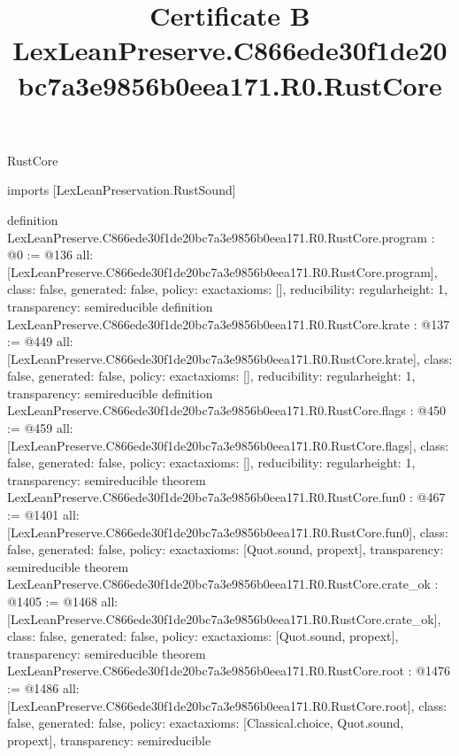 \begin{lexlean}{RustCore}
\title{Certificate B LexLeanPreserve.C866ede30f1de20bc7a3e9856b0eea171.R0.RustCore}
\begin{coremodule}
imports [LexLeanPreservation.RustSound]

definition LexLeanPreserve.C866ede30f1de20bc7a3e9856b0eea171.R0.RustCore.program : @0 := @136 {
  all: [LexLeanPreserve.C866ede30f1de20bc7a3e9856b0eea171.R0.RustCore.program],
  class: false,
  generated: false,
  policy: exact{axioms: []},
  reducibility: regular{height: 1},
  transparency: semireducible
}
definition LexLeanPreserve.C866ede30f1de20bc7a3e9856b0eea171.R0.RustCore.krate : @137 := @449 {
  all: [LexLeanPreserve.C866ede30f1de20bc7a3e9856b0eea171.R0.RustCore.krate],
  class: false,
  generated: false,
  policy: exact{axioms: []},
  reducibility: regular{height: 1},
  transparency: semireducible
}
definition LexLeanPreserve.C866ede30f1de20bc7a3e9856b0eea171.R0.RustCore.flags : @450 := @459 {
  all: [LexLeanPreserve.C866ede30f1de20bc7a3e9856b0eea171.R0.RustCore.flags],
  class: false,
  generated: false,
  policy: exact{axioms: []},
  reducibility: regular{height: 1},
  transparency: semireducible
}
theorem LexLeanPreserve.C866ede30f1de20bc7a3e9856b0eea171.R0.RustCore.fun0 : @467 := @1401 {
  all: [LexLeanPreserve.C866ede30f1de20bc7a3e9856b0eea171.R0.RustCore.fun0],
  class: false,
  generated: false,
  policy: exact{axioms: [Quot.sound, propext]},
  transparency: semireducible
}
theorem LexLeanPreserve.C866ede30f1de20bc7a3e9856b0eea171.R0.RustCore.crate_ok : @1405 := @1468 {
  all: [LexLeanPreserve.C866ede30f1de20bc7a3e9856b0eea171.R0.RustCore.crate_ok],
  class: false,
  generated: false,
  policy: exact{axioms: [Quot.sound, propext]},
  transparency: semireducible
}
theorem LexLeanPreserve.C866ede30f1de20bc7a3e9856b0eea171.R0.RustCore.root : @1476 := @1486 {
  all: [LexLeanPreserve.C866ede30f1de20bc7a3e9856b0eea171.R0.RustCore.root],
  class: false,
  generated: false,
  policy: exact{axioms: [Classical.choice, Quot.sound, propext]},
  transparency: semireducible
}


\end{coremodule}
\end{lexlean}

